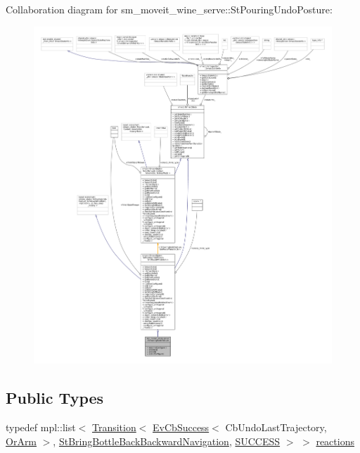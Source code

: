 Collaboration diagram for sm\+\_\+moveit\+\_\+wine\+\_\+serve\+:\+:St\+Pouring\+Undo\+Posture\+:
\nopagebreak
\begin{figure}[H]
\begin{center}
\leavevmode
\includegraphics[width=350pt]{structsm__moveit__wine__serve_1_1StPouringUndoPosture__coll__graph}
\end{center}
\end{figure}
\subsection*{Public Types}
\begin{DoxyCompactItemize}
\item 
typedef mpl\+::list$<$ \hyperlink{classsmacc_1_1Transition}{Transition}$<$ \hyperlink{structsmacc_1_1EvCbSuccess}{Ev\+Cb\+Success}$<$ Cb\+Undo\+Last\+Trajectory, \hyperlink{classsm__moveit__wine__serve_1_1OrArm}{Or\+Arm} $>$, \hyperlink{structsm__moveit__wine__serve_1_1StBringBottleBackBackwardNavigation}{St\+Bring\+Bottle\+Back\+Backward\+Navigation}, \hyperlink{structsmacc_1_1default__transition__tags_1_1SUCCESS}{S\+U\+C\+C\+E\+SS} $>$ $>$ \hyperlink{structsm__moveit__wine__serve_1_1StPouringUndoPosture_aafb240153173fa5a72cb42280e003b26}{reactions}
\end{DoxyCompactItemize}
